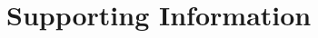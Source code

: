 \documentclass[10pt,letterpaper]{article}
\newcommand{\cursedforest}{\textsc{CursedForest}\xspace}
\newcommand{\mtry}{\texttt{mtry}\xspace}
\begin{document}
%
%
%
%
%
%
%
%


\clearpage
\section{Supporting Information}

\end{document}
